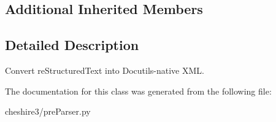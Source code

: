 \subsection*{Additional Inherited Members}


\subsection{Detailed Description}
\begin{DoxyVerb}Convert reStructuredText into Docutils-native XML.\end{DoxyVerb}
 

The documentation for this class was generated from the following file\-:\begin{DoxyCompactItemize}
\item 
cheshire3/pre\-Parser.\-py\end{DoxyCompactItemize}

